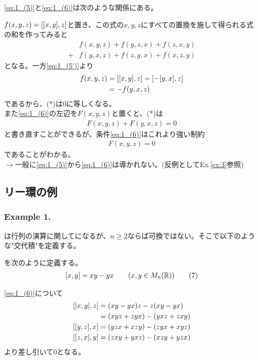 \documentclass[fleqn,twocolumn,titlepage,dvipdfmx]{jsarticle}
\begin{document}
\begin{remark}
  \eqref{eq:1_(5)}と\eqref{eq:1_(6)}は次のような関係にある。

  $f(x,y,z)=\comm{\comm{x}{y}}{z}$と置き、この式の$x,y,z$にすべての置換を施して得られる式の和を作ってみると
  \begin{align*}
    &f(x,y,z)+f(y,z,x)+f(z,x,y)\\
    +&f(y,x,z)+f(z,y,x)+f(x,z,y)\tag{$\ast$}
  \end{align*}
  となる。一方\eqref{eq:1_(5')}より
  \begin{align*}
    f(x,y,z)&=\comm{\comm{x}{y}}{z}=\comm{-\comm{y}{x}}{z}\\
    &=-f(y,x,z)
  \end{align*}
  であるから、($\ast$)は$0$に等しくなる。\\
  また\eqref{eq:1_(6)}の左辺を$F(x,y,z)$と置くと、($\ast$)は
  \begin{align*}
    F(x,y,z)+F(y,x,z) = 0
  \end{align*}
  と書き直すことができるが、条件\eqref{eq:1_(6)}はこれより強い制約
  \begin{align*}
    F(x,y,z)=0
  \end{align*}であることがわかる。\\
  $\longrightarrow$一般に\eqref{eq:1_(5)}から\eqref{eq:1_(6)}は導かれない。(反例としてEx.\ref{ex:3}参照)
\end{remark}


\subsection{リー環の例}
\subsubsection*{Example 1.}
は行列の演算に関してになるが、$n\ge2$ならば可換ではない。そこで以下のような"交代積"を定義する。

\begin{definition}[交代積]\label{Def:comm}
  を次のように定義する。
  \begin{align}
    \comm{x}{y}=xy-yx \qq{} (x,y\in M_n(\R)) \tag{7}\label{eq:1_(7)}
  \end{align}
\end{definition}

\begin{remark}
  \eqref{eq:1_(6)}について
  \begin{align*}
    \comm{\comm{x}{y}}{z}&=(xy-yx)z-z(xy-yx)\\
    &=(xyz+zyx)-(yxz+zxy)\\
    \comm{\comm{y}{z}}{x}&=(yzx+xzy)-(zyx+xyz)\\
    \comm{\comm{z}{x}}{y}&=(zxy+yxz)-(xzy+yzx)
  \end{align*}
  より差し引いて$0$となる。
\end{remark}
\end{document}
